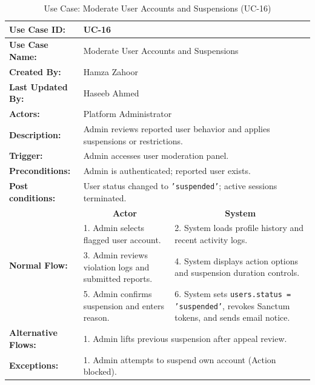\begin{table}[H]
\centering
\small
\caption{Use Case: Moderate User Accounts and Suspensions (UC-16)}
\label{tab:uc16_spec}
\begin{tabular}{|p{3.2cm}|p{5.5cm}|p{5.5cm}|}
\hline
\textbf{Use Case ID:} & \multicolumn{2}{p{11.4cm}|}{UC-16} \\ \hline
\textbf{Use Case Name:} & \multicolumn{2}{p{11.4cm}|}{Moderate User Accounts and Suspensions} \\ \hline
\textbf{Created By:} & \multicolumn{2}{p{11.4cm}|}{Hamza Zahoor} \\ \hline
\textbf{Last Updated By:} & \multicolumn{2}{p{11.4cm}|}{Haseeb Ahmed} \\ \hline
\textbf{Actors:} & \multicolumn{2}{p{11.4cm}|}{Platform Administrator} \\ \hline
\textbf{Description:} & \multicolumn{2}{p{11.4cm}|}{Admin reviews reported user behavior and applies suspensions or restrictions.} \\ \hline
\textbf{Trigger:} & \multicolumn{2}{p{11.4cm}|}{Admin accesses user moderation panel.} \\ \hline
\textbf{Preconditions:} & \multicolumn{2}{p{11.4cm}|}{Admin is authenticated; reported user exists.} \\ \hline
\textbf{Post conditions:} & \multicolumn{2}{p{11.4cm}|}{User status changed to \texttt{'suspended'}; active sessions terminated.} \\ \hline
\multirow{4}{*}{\textbf{Normal Flow:}} & \multicolumn{1}{c|}{\textbf{Actor}} & \multicolumn{1}{c|}{\textbf{System}} \\ \cline{2-3}
& 1. Admin selects flagged user account. & 2. System loads profile history and recent activity logs. \vspace{2pt} \\
& 3. Admin reviews violation logs and submitted reports. & 4. System displays action options and suspension duration controls. \vspace{2pt} \\
& 5. Admin confirms suspension and enters reason. & 6. System sets \texttt{users.status = 'suspended'}, revokes Sanctum tokens, and sends email notice. \\ \hline
\textbf{Alternative Flows:} & \multicolumn{2}{p{11.4cm}|}{1. Admin lifts previous suspension after appeal review.} \\ \hline
\textbf{Exceptions:} & \multicolumn{2}{p{11.4cm}|}{1. Admin attempts to suspend own account (Action blocked).} \\ \hline
\end{tabular}
\end{table}

